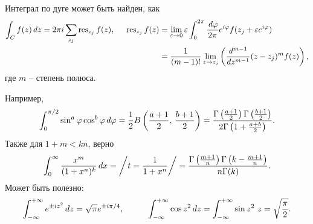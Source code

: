 
Интеграл по дуге может быть найден, как
\begin{align*}
    \int_C f(z) \, d z = 2 \pi i \sum_{z_j} \mathop{\mathrm{res}}\nolimits_{z_j} f(z),
    \hspace{5 mm} 
    \mathop{\mathrm{res}}\nolimits_{z_j} f(z) &= \lim_{\varepsilon \to 0} \varepsilon \int_0^{2\pi} \frac{\, d \varphi}{2\pi} e^{i \varphi} f(z_j + \varepsilon e^{i \varphi}) \\ 
    &= \frac{1}{(m-1)!} \lim_{z \to z_j} \left(
        \frac{d^{m-1} }{d z^{m-1}} (z-z_j)^m f(z)
    \right),
\end{align*}
где $m$ -- степень полюса. 



Например,
\begin{equation*}
    \int_0^{\pi/2} \sin^a \varphi \cos^b \varphi \, d \varphi =  \frac{1}{2} B\left(\frac{a+1}{2},\, \frac{b+1}{2}\right) = \frac{\Gamma\left(\frac{a+1}{2}\right) \Gamma\left(\frac{b+1}{2}\right)}{2 \Gamma\left(1 + \frac{a + b}{2}\right)}.
\end{equation*}
Также для $1 + m < kn$, верно
\begin{equation*}
    \int_{0}^{\infty}  \frac{x^m}{(1+x^n)^k} \, d x = \bigg/
        t = \frac{1}{1+x^n}
    \bigg/ = \frac{\Gamma \left(\frac{m+1}{n}\right) \Gamma \left(k-\frac{m+1}{n}\right)}{n \Gamma (k)}.
\end{equation*}
Может быть полезно:
\begin{equation*}
    \int_{-\infty}^{+\infty} e^{\pm i z^2} \d z = \sqrt{\pi} e^{\pm i \pi / 4},
    \hspace{10 mm} 
    \int_{-\infty}^{+\infty} \cos z^2 \d z = \int_{-\infty}^{+\infty} \sin z^2 \ z = \sqrt{\frac{\pi}{2}}.
\end{equation*}







